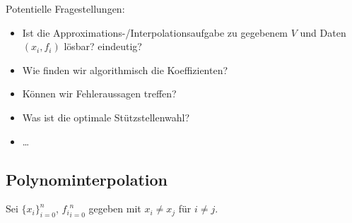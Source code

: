 \documentclass[a4paper,11pt]{scrartcl}
\begin{document}
Potentielle Fragestellungen:
\begin{itemize}
	\item 
		Ist die Approximations-/Interpolationsaufgabe zu gegebenem $V$ und Daten $(x_i,f_i)$ lösbar? eindeutig?
	\item
		Wie finden wir algorithmisch die Koeffizienten?
	\item
		Können wir Fehleraussagen treffen?
	\item
		Was ist die optimale Stützstellenwahl?
	\item
		\dots
\end{itemize}


\subsection{Polynominterpolation}

Sei $\{x_i\}_{i=0}^n$, ${f_i}_{i=0}^n$ gegeben mit $x_i\neq x_j$ für $i\neq j$.
\end{document}

